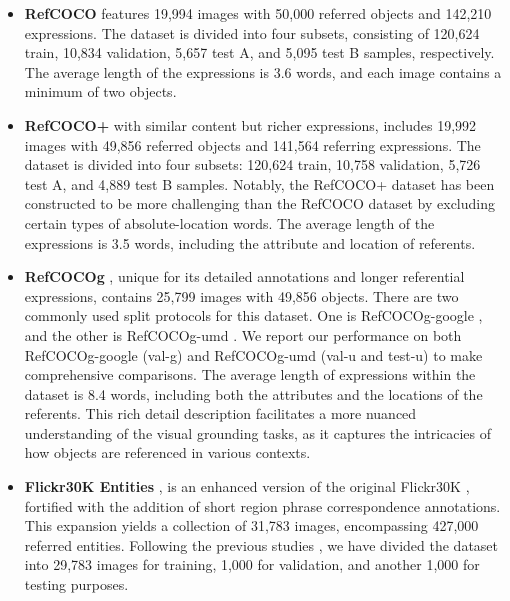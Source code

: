 \begin{itemize}
  \item \textbf{RefCOCO} features 19,994 images with 50,000 referred objects and 142,210 expressions. The dataset is divided into four subsets, consisting of 120,624 train, 10,834 validation, 5,657 test A, and 5,095 test B samples, respectively. The average length of the expressions is 3.6 words, and each image contains a minimum of two objects.

 \item
\textbf{RefCOCO+} with similar content but richer expressions, includes 19,992 images with 49,856 referred objects and 141,564 referring expressions. The dataset is divided into four subsets: 120,624 train, 10,758 validation, 5,726 test A, and 4,889 test B samples. Notably, the RefCOCO+ dataset has been constructed to be more challenging than the RefCOCO dataset by excluding certain types of absolute-location words. The average length of the expressions is 3.5 words, including the attribute and location of referents.

 \item
\textbf{RefCOCOg} , unique for its detailed annotations and longer referential expressions, contains 25,799 images with 49,856 objects. There are two commonly used split protocols for this dataset. One is RefCOCOg-google \cite{mao2016refcocogg}, and the other is RefCOCOg-umd \cite{nagaraja2016refcocogu}. We report our performance on both RefCOCOg-google (val-g) and RefCOCOg-umd (val-u and test-u) to make comprehensive comparisons. The average length of expressions within the dataset is 8.4 words, including both the attributes and the locations of the referents. This rich detail description facilitates a more nuanced understanding of the visual grounding tasks, as it captures the intricacies of how objects are referenced in various contexts.

 \item
\textbf{Flickr30K Entities} \cite{plummer2015flickr30k}, is an enhanced version of the original Flickr30K \cite{young2014image}, fortified with the addition of short region phrase correspondence annotations. This expansion yields a collection of 31,783 images, encompassing 427,000 referred entities. Following the previous studies \cite{xiao2024hivg,wang2023cogvlm}, we have divided the dataset into 29,783 images for training, 1,000 for validation, and another 1,000 for testing purposes.
\end{itemize}



